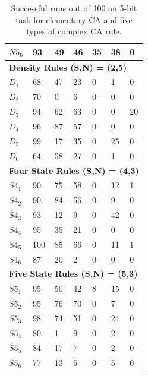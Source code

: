 \documentclass{elsarticle}
\begin{document}
\begin{multicols}{2}
\begin{table}[!htbp]
\begin{tabular}{|l|l|l|l|l|l|l|}
$N5_{6}$ & 93 & 49 & 46 & 35 & 38 & 0  \\ \hline
\multicolumn{7}{|l|}{\textbf{Density Rules (S,N) = (2,5)}} \\ \hline
$D_{1}$ & 68 & 47 & 23 & 0 & 1 & 0  \\ \hline
$D_{2}$ & 70 & 0 & 6 & 0 & 0 & 0 \\ \hline
$D_{3}$ & 94 & 62 & 63 & 0 & 0 & 20 \\ \hline
$D_{4}$ & 96 & 87 & 57 & 0 & 0 & 0 \\ \hline
$D_{5}$ & 99 & 17 & 35 & 0 & 25 & 0 \\ \hline
$D_{6}$ & 64 & 58 & 27 & 0 & 1 & 0 \\ \hline
\multicolumn{7}{|l|}{\textbf{Four State Rules (S,N) = (4,3)}} \\ \hline
$S4_{1}$ & 90 & 75 & 58 & 0 & 12  & 1 \\ \hline
$S4_{2}$ & 90 & 84 & 56 & 0 & 9 & 0  \\ \hline
$S4_{3}$ & 93 & 12 & 9 & 0 & 42 & 0 \\ \hline
$S4_{4}$ & 95 & 35 & 21 & 0 & 0 & 0 \\ \hline
$S4_{5}$ & 100 & 85 & 66 & 0 & 11 & 1 \\ \hline
$S4_{6}$ & 87 & 20 & 2 & 0 & 0 & 0 \\ \hline
\multicolumn{7}{|l|}{\textbf{Five State Rules (S,N) = (5,3)}} \\ \hline
$S5_{1}$ & 95 & 50 & 42 & 8 & 15 & 0 \\ \hline
$S5_{2}$ & 95 & 76 & 70 & 0 & 7 & 0 \\ \hline
$S5_{3}$ & 98 & 74 & 51 & 0 & 24 & 0 \\ \hline
$S5_{4}$ & 80 & 1 & 9 & 0 & 2 & 0 \\ \hline
$S5_{5}$ & 84 & 17 & 7 & 0 & 2 & 0 \\ \hline
$S5_{6}$ & 77 & 13 & 6 & 0 & 5 & 0 \\ \hline
\end{tabular}
\caption{Successful runs out of 100 on 5-bit task for elementary CA and five 
    types of complex CA rule.}
\label{table:results}
\end{table}




\end{multicols}
\end{document}
